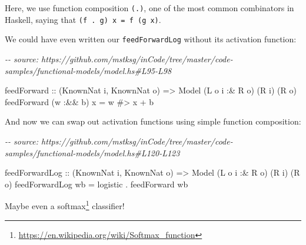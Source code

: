 \documentclass[]{article}
\newenvironment{Shaded}{}{}
\newcommand{\CommentTok}[1]{\textcolor[rgb]{0.38,0.63,0.69}{\textit{#1}}}
\newcommand{\DataTypeTok}[1]{\textcolor[rgb]{0.56,0.13,0.00}{#1}}
\newcommand{\NormalTok}[1]{#1}
\newcommand{\OperatorTok}[1]{\textcolor[rgb]{0.40,0.40,0.40}{#1}}
\newcommand{\OtherTok}[1]{\textcolor[rgb]{0.00,0.44,0.13}{#1}}
\renewcommand{\href}[2]{#2\footnote{\url{#1}}}
\begin{document}
Here, we use function composition \texttt{(.)}, one of the most common
combinators in Haskell, saying that \texttt{(f\ .\ g)\ x\ =\ f\ (g\ x)}.

We could have even written our \texttt{feedForwardLog} without its activation
function:

\begin{Shaded}
\begin{Highlighting}[]
\CommentTok{{-}{-} source: https://github.com/mstksg/inCode/tree/master/code{-}samples/functional{-}models/model.hs\#L95{-}L98}

\NormalTok{feedForward}
\OtherTok{    ::}\NormalTok{ (}\DataTypeTok{KnownNat}\NormalTok{ i, }\DataTypeTok{KnownNat}\NormalTok{ o)}
    \OtherTok{=>} \DataTypeTok{Model}\NormalTok{ (}\DataTypeTok{L}\NormalTok{ o i }\OperatorTok{:\&} \DataTypeTok{R}\NormalTok{ o) (}\DataTypeTok{R}\NormalTok{ i) (}\DataTypeTok{R}\NormalTok{ o)}
\NormalTok{feedForward (w }\OperatorTok{:\&\&}\NormalTok{ b) x }\OtherTok{=}\NormalTok{ w }\OperatorTok{\#>}\NormalTok{ x }\OperatorTok{+}\NormalTok{ b}
\end{Highlighting}
\end{Shaded}

And now we can swap out activation functions using simple function composition:

\begin{Shaded}
\begin{Highlighting}[]
\CommentTok{{-}{-} source: https://github.com/mstksg/inCode/tree/master/code{-}samples/functional{-}models/model.hs\#L120{-}L123}

\NormalTok{feedForwardLog\textquotesingle{}}
\OtherTok{    ::}\NormalTok{ (}\DataTypeTok{KnownNat}\NormalTok{ i, }\DataTypeTok{KnownNat}\NormalTok{ o)}
    \OtherTok{=>} \DataTypeTok{Model}\NormalTok{ (}\DataTypeTok{L}\NormalTok{ o i }\OperatorTok{:\&} \DataTypeTok{R}\NormalTok{ o) (}\DataTypeTok{R}\NormalTok{ i) (}\DataTypeTok{R}\NormalTok{ o)}
\NormalTok{feedForwardLog\textquotesingle{} wb }\OtherTok{=}\NormalTok{ logistic }\OperatorTok{.}\NormalTok{ feedForward wb}
\end{Highlighting}
\end{Shaded}

Maybe even a \href{https://en.wikipedia.org/wiki/Softmax_function}{softmax}
classifier!
\end{document}
